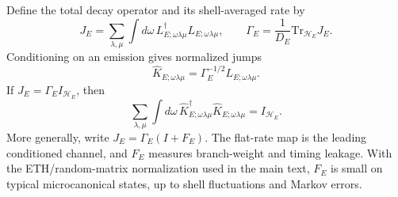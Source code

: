 \documentclass[12pt]{article}
\newcommand{\Tr}{\mathrm{Tr}}
\begin{document}
Define the total decay operator and its shell-averaged rate by
\begin{equation}
    J_E
    =
    \sum_{\lambda,\mu}\int d\omega\,
    L_{E;\omega\lambda\mu}^\dagger L_{E;\omega\lambda\mu},
    \qquad
    \Gamma_E=\frac{1}{D_E}\Tr_{\mathcal H_E}J_E .
\end{equation}
Conditioning on an emission gives normalized jumps
\begin{equation}
    \widehat K_{E;\omega\lambda\mu}
    =
    \Gamma_E^{-1/2}L_{E;\omega\lambda\mu}.
\end{equation}
If $J_E=\Gamma_EI_{\mathcal H_E}$, then
\begin{equation}
    \sum_{\lambda,\mu}\int d\omega\,
    \widehat K_{E;\omega\lambda\mu}^\dagger
    \widehat K_{E;\omega\lambda\mu}
    =
    I_{\mathcal H_E}.
\end{equation}
More generally, write $J_E=\Gamma_E(I+F_E)$.  The flat-rate map is the leading
conditioned channel, and $F_E$ measures branch-weight and timing leakage.
With the ETH/random-matrix normalization used in the main text, $F_E$ is small
on typical microcanonical states, up to shell fluctuations and Markov errors.
\end{document}
